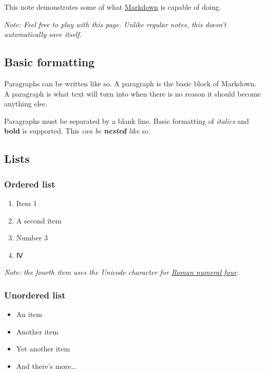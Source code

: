 This note demonstrates some of what
\href{http://daringfireball.net/projects/markdown/}{Markdown} is capable
of doing.

\emph{Note: Feel free to play with this page. Unlike regular notes, this
doesn't automatically save itself.}

\hypertarget{basic-formatting}{%
\subsection{Basic formatting}\label{basic-formatting}}

Paragraphs can be written like so. A paragraph is the basic block of
Markdown. A paragraph is what text will turn into when there is no
reason it should become anything else.

Paragraphs must be separated by a blank line. Basic formatting of
\emph{italics} and \textbf{bold} is supported. This \emph{can be
\textbf{nested} like} so.

\hypertarget{lists}{%
\subsection{Lists}\label{lists}}

\hypertarget{ordered-list}{%
\subsubsection{Ordered list}\label{ordered-list}}

\begin{enumerate}
\def\labelenumi{\arabic{enumi}.}
\tightlist
\item
  Item 1
\item
  A second item
\item
  Number 3
\item
  Ⅳ
\end{enumerate}

\emph{Note: the fourth item uses the Unicode character for
\href{http://www.fileformat.info/info/unicode/char/2163/index.htm}{Roman
numeral four}.}

\hypertarget{unordered-list}{%
\subsubsection{Unordered list}\label{unordered-list}}

\begin{itemize}
\tightlist
\item
  An item
\item
  Another item
\item
  Yet another item
\item
  And there's more\ldots{}
\end{itemize}

